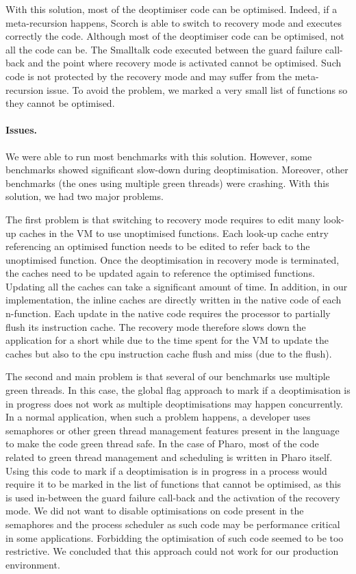 \documentclass[a4paper,12pt,twoside]{../includes/ThesisStyle}
\begin{document}
With this solution, most of the deoptimiser code can be optimised. Indeed, if a meta-recursion happens, Scorch is able to switch to recovery mode and executes correctly the code. Although most of the deoptimiser code can be optimised, not all the code can be. The Smalltalk code executed between the guard failure call-back and the point where recovery mode is activated cannot be optimised. Such code is not protected by the recovery mode and may suffer from the meta-recursion issue. To avoid the problem, we marked a very small list of functions so they cannot be optimised.

\paragraph{Issues.} We were able to run most benchmarks with this solution. However, some benchmarks showed significant slow-down during deoptimisation. Moreover, other benchmarks (the ones using multiple green threads) were crashing. With this solution, we had two major problems. 

The first problem is that switching to recovery mode requires to edit many look-up caches in the VM to use unoptimised functions. Each look-up cache entry referencing an optimised function needs to be edited to refer back to the unoptimised function. Once the deoptimisation in recovery mode is terminated, the caches need to be updated again to reference the optimised functions. Updating all the caches can take a significant amount of time. In addition, in our implementation, the inline caches are directly written in the native code of each n-function. Each update in the native code requires the processor to partially flush its instruction cache. The recovery mode therefore slows down the application for a short while due to the time spent for the VM to update the caches but also to the cpu instruction cache flush and miss (due to the flush).

The second and main problem is that several of our benchmarks use multiple green threads. In this case, the global flag approach to mark if a deoptimisation is in progress does not work as multiple deoptimisations may happen concurrently. In a normal application, when such a problem happens, a developer uses semaphores or other green thread management features present in the language to make the code green thread safe. In the case of Pharo, most of the code related to green thread management and scheduling is written in Pharo itself. Using this code to mark if a deoptimisation is in progress in a process would require it to be marked in the list of functions that cannot be optimised, as this is used in-between the guard failure call-back and the activation of the recovery mode. We did not want to disable optimisations on code present in the semaphores and the process scheduler as such code may be performance critical in some applications. Forbidding the optimisation of such code seemed to be too restrictive. We concluded that this approach could not work for our production environment.
\end{document}
